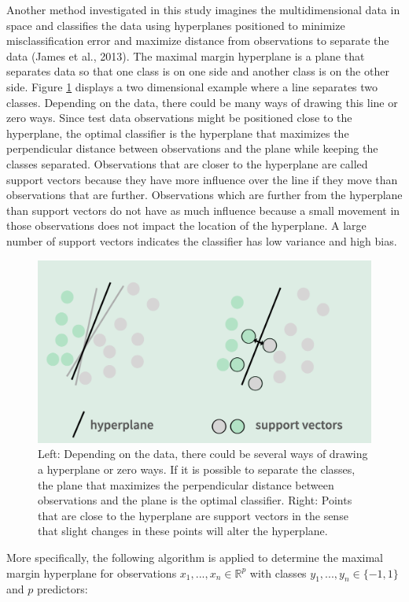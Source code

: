 \documentclass[12pt,twoside]{reedthesis}
\begin{document}
Another method investigated in this study imagines the multidimensional data in space and classifies the data using hyperplanes positioned to minimize misclassification error and maximize distance from observations to separate the data (James et al., 2013). The maximal margin hyperplane is a plane that separates data so that one class is on one side and another class is on the other side. Figure \ref{fig:hyperplane} displays a two dimensional example where a line separates two classes. Depending on the data, there could be many ways of drawing this line or zero ways. Since test data observations might be positioned close to the hyperplane, the optimal classifier is the hyperplane that maximizes the perpendicular distance between observations and the plane while keeping the classes separated. Observations that are closer to the hyperplane are called support vectors because they have more influence over the line if they move than observations that are further. Observations which are further from the hyperplane than support vectors do not have as much influence because a small movement in those observations does not impact the location of the hyperplane. A large number of support vectors indicates the classifier has low variance and high bias.
\begin{figure}

{\centering \includegraphics[width=0.7\linewidth]{figure/hyperplane} 

}

\caption{Left: Depending on the data, there could be several ways of drawing a hyperplane or zero ways. If it is possible to separate the classes, the plane that maximizes the perpendicular distance between observations and the plane is the optimal classifier. Right: Points that are close to the hyperplane are support vectors in the sense that slight changes in these points will alter the hyperplane.}\label{fig:hyperplane}
\end{figure}
More specifically, the following algorithm is applied to determine the maximal margin hyperplane for observations \(x_1, ..., x_n \in \mathbb{R}^p\) with classes \(y_1, ..., y_n \in \{-1, 1\}\) and \(p\) predictors:
\end{document}
